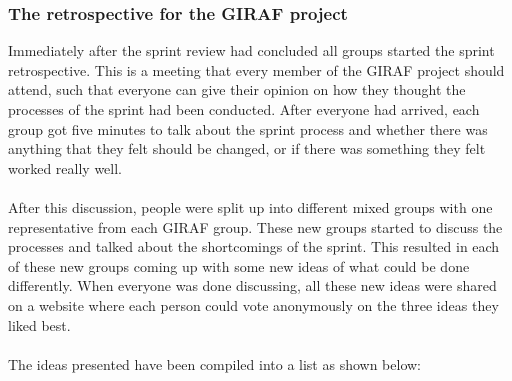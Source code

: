 \subsubsection{The retrospective for the GIRAF project}\label{retro1giraf}
Immediately after the sprint review had concluded all groups started the sprint retrospective.
This is a meeting that every member of the GIRAF project should attend, such that everyone can give their opinion on how they thought the processes of the sprint had been conducted.
After everyone had arrived, each group got five minutes to talk about the sprint process and whether there was anything that they felt should be changed, or if there was something they felt worked really well.
\\\\
After this discussion, people were split up into different mixed groups with one representative from each GIRAF group.
These new groups started to discuss the processes and talked about the shortcomings of the sprint.
This resulted in each of these new groups coming up with some new ideas of what could be done differently.
When everyone was done discussing, all these new ideas were shared on a website where each person could vote anonymously on the three ideas they liked best.
\\\\
The ideas presented have been compiled into a list as shown below:
